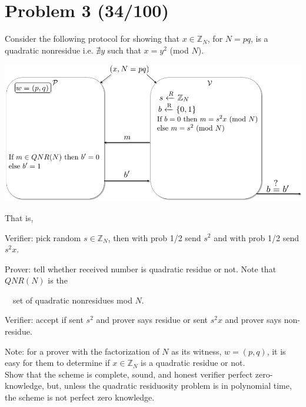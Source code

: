 \documentclass[11pt]{article}
\begin{document}
\section*{Problem 3 (34/100)}
Consider the following protocol for showing that $x\in \mathbb{Z}_N$, for $N=pq$, is a quadratic nonresidue i.e. $\nexists y$ such that $x=y^2$ (mod $N$).

\begin{center}
			\includegraphics[scale=.55]{QNR_ZK.png}
\end{center}

That is, 

Verifier: pick random $s\in\mathbb{Z}_N$, then with prob 1/2 send $s^2$ and with prob 1/2 send $s^2 x$. 

Prover: tell whether received number is quadratic residue or not. Note that $QNR(N)$ is the 

\quad\quad\quad\ \ set of quadratic nonresidues mod $N$. 

Verifier: accept if sent $s^2$ and prover says residue or sent $s^2x$ and prover says non-residue.

\noindent Note: for a prover with the factorization of $N$ as its witness, $w=(p,q)$, it is easy for them to determine if $x\in \mathbb{Z}_N$ is a quadratic residue or not.
\\

\noindent Show that the scheme is complete, sound, and honest verifier perfect zero-knowledge, but, unless the quadratic residuosity problem is in polynomial time, the scheme is not perfect zero knowledge.
\end{document}
